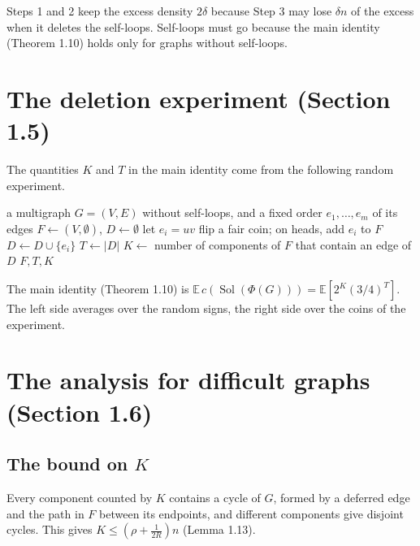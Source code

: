 ﻿\documentclass[10pt,a4paper]{article}
\newcommand{\E}{\mathbb{E}}
\DeclareMathOperator{\Sol}{Sol}
\begin{document}
Steps 1 and 2 keep the excess density \(2\delta\) because Step 3 may lose
\(\delta n\) of the excess when it deletes the self-loops. Self-loops must go
because the main identity (Theorem 1.10) holds only for graphs without
self-loops.

\section{The deletion experiment (Section 1.5)}\label{sec:experiment}

The quantities \(K\) and \(T\) in the main identity come from the following
random experiment.

\begin{algorithm}[H]
\caption{Deletion experiment}\label{alg:deletion}
\begin{algorithmic}[1]
\Require a multigraph \(G=(V,E)\) without self-loops, and a fixed order
  \(e_1,\dots,e_m\) of its edges
\State \(F\gets(V,\emptyset)\), \(D\gets\emptyset\)
  \State let \(e_i=uv\)
    \State flip a fair coin; on heads, add \(e_i\) to \(F\)
  \Else
    \State \(D\gets D\cup\{e_i\}\) 
  \EndIf
\EndFor
\State \(T\gets|D|\)
\State \(K\gets\) number of components of \(F\) that contain an edge of \(D\)
\State \Return \(F,T,K\)
\end{algorithmic}
\end{algorithm}

The main identity (Theorem 1.10) is
\(\E\,c(\Sol(\Phi(G)))=\E[2^K(3/4)^T]\). The left side averages over the random
signs, the right side over the coins of the experiment.

\section{The analysis for difficult graphs (Section 1.6)}\label{sec:difficult}

\subsection{The bound on \(K\)}

Every component counted by \(K\) contains a cycle of \(G\), formed by a
deferred edge and the path in \(F\) between its endpoints, and different
components give disjoint cycles. This gives
\(K\le(\rho+\frac1{2R})n\) (Lemma 1.13).
\end{document}

